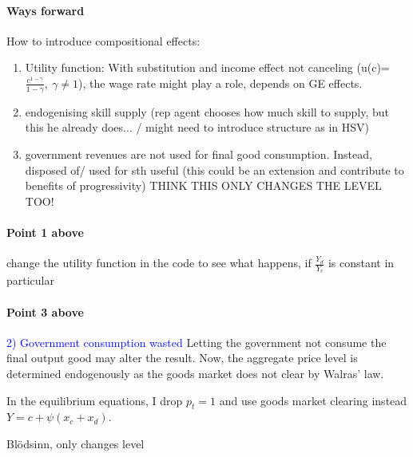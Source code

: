 \paragraph{Ways forward}
How to introduce compositional effects:
\begin{enumerate}
	\item 	Utility function: With substitution and income effect not canceling (u(c)=$\frac{c^{1-\gamma}}{1-\gamma},\ \gamma\neq 1$), the wage rate might play a role, depends on GE effects.
	\item endogenising skill supply (rep agent chooses how much skill to supply, but this he already does... / might need to introduce structure as in HSV)
	\item government revenues are not used for final good consumption. Instead,  disposed of/ used for sth useful (this could be an extension and contribute to benefits of progressivity) THINK THIS ONLY CHANGES THE LEVEL TOO!
\end{enumerate}
\paragraph{Point 1 above}
change the utility function in the code to see what happens, if $\frac{Y_d}{Y_c}$ is constant in particular 
\paragraph{Point 3 above}
\textcolor{blue}{2) Government consumption wasted}
Letting the government not consume the final output good may alter the result. 
Now, the aggregate price level is determined endogenously as the goods market does not clear by Walras' law. 

In the equilibrium equations, I drop $p_t=1$ and use goods market clearing instead\\ $Y=c+\psi (x_c+x_d)$.

Blödsinn, only changes level